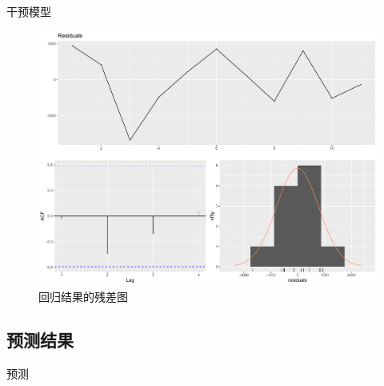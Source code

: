 \documentclass[10pt]{beamer}
\begin{document}
\begin{frame}{干预模型}
\begin{figure}[H]
\begin{minipage}[t]{0.48\textwidth}
      \centering %
      \includegraphics[width=1\textwidth]{figures/loss_model_resi.pdf} %
      \caption{回归结果的残差图} %
      \label{loss_model_resi} %
    \end{minipage}
  \end{figure} 
\end{frame}

\subsection{预测结果}
\begin{frame}{预测}
  \begin{table}[H]
    \centering
    \caption{2022年3月起社会消费品零售总额的损失（单位：亿元）}
    \label{loss_2020_table}%
  \end{table}%
\end{frame}
\end{document}
